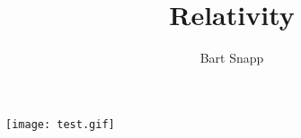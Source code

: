 \documentclass{ximera}
\title{Relativity}
\author{Bart Snapp}
\begin{document}
\begin{abstract}
\end{abstract}
\maketitle

\begin{image}
  \texttt{[image: test.gif]}
\end{image}
\end{document}
